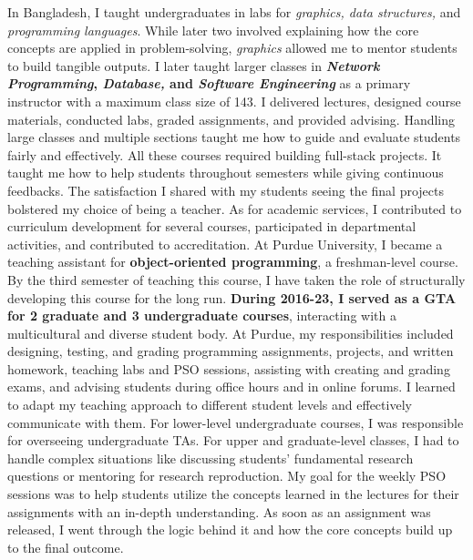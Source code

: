 \documentclass[10pt]{article}
\newcommand{\textcourse}[1]{\textit{#1}}
\begin{document}
In Bangladesh, I taught undergraduates in labs for \textit{graphics, data structures,} and \textit{programming languages}. While later two involved explaining how the core concepts are applied in problem-solving, \textit{graphics} allowed me to mentor students to build tangible outputs. I later taught larger classes 
in \textbf{\textcourse{Network Programming}, \textit{Database,} and \textit{Software Engineering}} as a primary instructor
with a maximum class size of 143. %
I delivered lectures, designed course materials, conducted labs, graded assignments, and provided advising.
Handling large classes and multiple sections taught me how to guide and evaluate students fairly and effectively.
All these courses required building full-stack projects. It taught me how to help students throughout semesters while giving continuous feedbacks. The satisfaction I shared with my students seeing the final projects
bolstered my choice of being a teacher. As for academic services,
I contributed to curriculum development for several courses, participated in departmental activities, and
contributed to accreditation.
%
At Purdue University, I became a teaching assistant for 
\textbf{object-oriented programming}, a freshman-level course. By the third semester of teaching this course, 
I have taken the role of structurally developing this course for the long run.
\textbf{During 2016-23, I served as a GTA for 2 graduate 
and 3 undergraduate courses}, interacting with a multicultural and diverse student body. At Purdue, my responsibilities included designing, testing, and grading programming assignments, projects, and written homework, teaching labs and PSO sessions, assisting with creating and grading exams, and advising students during office hours and in online forums. I learned to adapt my teaching approach to different student levels and effectively communicate with them.  For lower-level undergraduate courses, I was responsible for overseeing undergraduate TAs. For upper and graduate-level classes, I had to handle complex situations like discussing students' fundamental research questions or mentoring for research reproduction. My goal for the weekly PSO sessions was to help students utilize the concepts learned in the lectures for their assignments with an in-depth understanding. As soon as an assignment was released, I went through the logic behind it and how the core concepts build up to the final outcome. 
\end{document}
